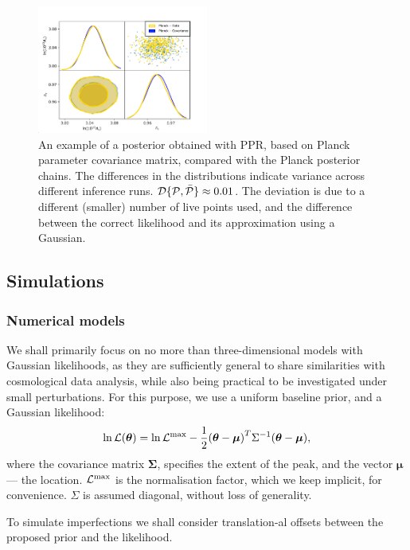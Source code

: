 \documentclass[usenatbib]{mnras}
\begin{document}
\begin{figure}
  \includegraphics[width=0.5\textwidth]{./illustrations/triangle-fit.pdf}
  \caption{An example of a posterior obtained with PPR, based on
    Planck parameter covariance matrix, compared with the Planck
    posterior chains. The differences in the distributions indicate
    variance across different inference runs.
    ${\cal D}\{ {\cal P}, \bar{\cal P}\} \approx 0.01$. The deviation
    is due to a different (smaller) number of live points used, and
    the difference between the correct likelihood and its
    approximation using a Gaussian. \label{fig:overlay-posteriors}}
\end{figure}


\subsection{Simulations}
\subsubsection{Numerical models}

We shall primarily focus on no more than three-dimensional models with
Gaussian likelihoods, as they are sufficiently general to share
similarities with cosmological data analysis, while also being
practical to be investigated under small perturbations.  For this
purpose, we use a uniform baseline prior, and a Gaussian likelihood:
\begin{equation}
  \ln {\cal L}(\bm{\theta}) = \ln {\cal L}^\text{max}- \dfrac{1}{2}{(\bm{\theta} - \bm{\mu})}^{T}\Sigma^{-1}(\bm{\theta}-\bm{\mu}),
\end{equation}
where the covariance matrix \(\bm{\Sigma}\), specifies the extent of
the peak, and the vector \(\bm{\mu}\) --- the location.
\({\cal L}^\text{max}\) is the normalisation factor, which we keep
implicit, for convenience. $\Sigma$ is assumed diagonal, without loss
of generality.

To simulate imperfections we shall consider translation-al offsets
between the proposed prior and the likelihood.
\end{document}
